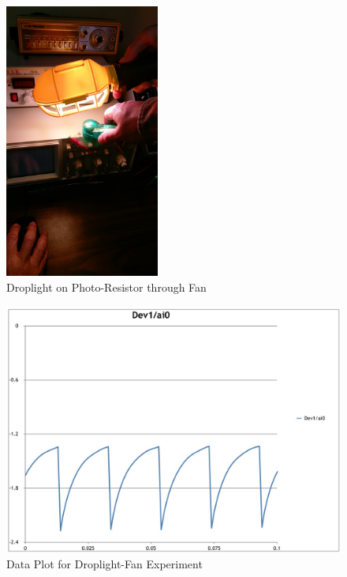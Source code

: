 \documentclass[12pt]{article}
\begin{document}
\bigskip

\begin{figure}[h!] %
   \centering
   \includegraphics[width=2in]{droplight_fan_photoresistor.jpg} 
   \caption{Droplight on Photo-Resistor through Fan}
   \label{fig:example}
\end{figure}

\newpage

\begin{figure}[h!] %
   \centering
   \includegraphics[width=5in]{data1_plot.jpg} 
   \caption{Data Plot for Droplight-Fan Experiment}
   \label{fig:example}
\end{figure}

\bigskip
\end{document}
